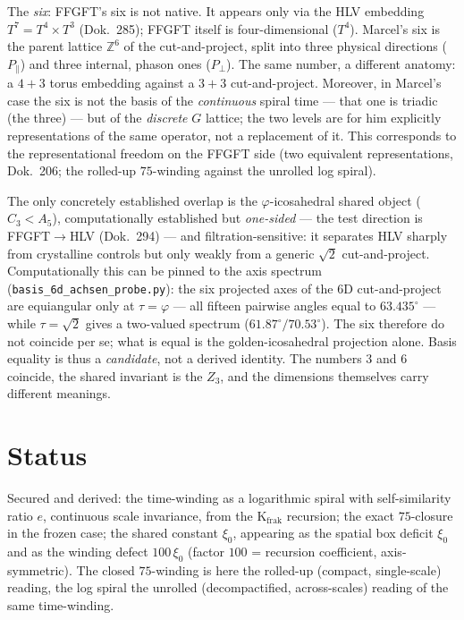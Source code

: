 The \emph{six}: FFGFT's six is not native. It appears only via the HLV embedding
$T^7=T^4\times T^3$ (Dok.~285); FFGFT itself is four-dimensional ($T^4$). Marcel's six is the parent
lattice $\mathbb{Z}^6$ of the cut-and-project, split into three physical directions
($P_\parallel$) and three internal, phason ones ($P_\perp$). The same number, a different anatomy:
a $4+3$ torus embedding against a $3+3$ cut-and-project. Moreover, in Marcel's case the six is not
the basis of the \emph{continuous} spiral time --- that one is triadic (the three) --- but of the
\emph{discrete} $G$ lattice; the two levels are for him explicitly representations of the same
operator, not a replacement of it. This corresponds to the representational freedom on the FFGFT
side (two equivalent representations, Dok.~206; the rolled-up $75$-winding against the unrolled log
spiral).

The only concretely established overlap is the $\varphi$-icosahedral shared object ($C_3<A_5$),
computationally established but \emph{one-sided} --- the test direction is FFGFT$\to$HLV
(Dok.~294) --- and filtration-sensitive: it separates HLV sharply from crystalline controls but
only weakly from a generic $\sqrt2$ cut-and-project. Computationally this can be pinned to the axis
spectrum (\texttt{basis\_6d\_achsen\_probe.py}): the six projected axes of the $6$D cut-and-project
are equiangular only at $\tau=\varphi$ --- all fifteen pairwise angles equal to $63{.}435^\circ$ ---
while $\tau=\sqrt2$ gives a two-valued spectrum ($61{.}87^\circ/70{.}53^\circ$). The six therefore
do not coincide per se; what is equal is the golden-icosahedral projection alone. Basis equality is
thus a \emph{candidate}, not a derived identity. The numbers $3$ and $6$ coincide, the shared
invariant is the $Z_3$, and the dimensions themselves carry different meanings.

\section{Status}
Secured and derived: the time-winding as a logarithmic spiral with self-similarity ratio $e$,
continuous scale invariance, from the K$_{\text{frak}}$ recursion; the exact $75$-closure in the
frozen case; the shared constant $\xi_0$, appearing as the spatial box deficit $\xi_0$ and as the
winding defect $100\,\xi_0$ (factor $100$ = recursion coefficient, axis-symmetric). The closed
$75$-winding is here the rolled-up (compact, single-scale) reading, the log spiral the unrolled
(decompactified, across-scales) reading of the same time-winding.

